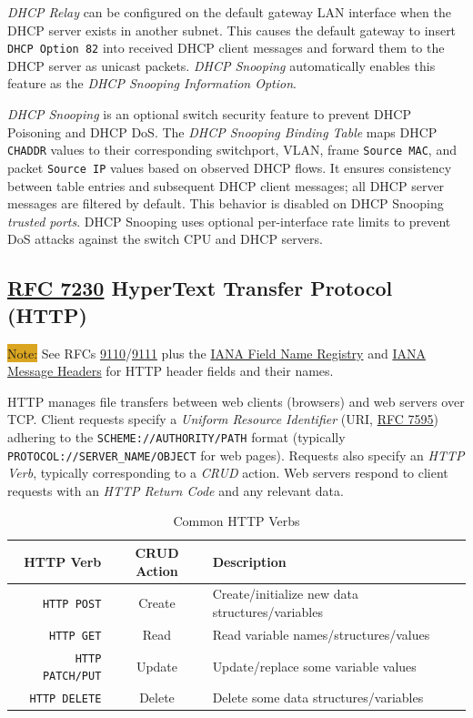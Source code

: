 \documentclass[12pt]{article}
\newcommand{\note}[1]{\colorbox{#1}{Note:}}
\newcommand{\rfc}[1]{\href{https://datatracker.ietf.org/doc/html/rfc#1}{#1}}
\newcommand{\RFC}[1]{\href{https://datatracker.ietf.org/doc/html/rfc#1}{RFC #1}}
\begin{document}
	\textit{DHCP Relay} can be configured on the default gateway LAN interface when the DHCP server exists in another subnet. This causes the default gateway to insert \texttt{DHCP Option 82} into received DHCP client messages and forward them to the DHCP server as unicast packets. \textit{DHCP Snooping} automatically enables this feature as the \textit{DHCP Snooping Information Option}.

	\textit{DHCP Snooping} is an optional switch security feature to prevent DHCP Poisoning and DHCP DoS. The \textit{DHCP Snooping Binding Table} maps DHCP \texttt{CHADDR} values to their corresponding switchport, VLAN, frame \texttt{Source MAC}, and packet \texttt{Source IP} values based on observed DHCP flows. It ensures consistency between table entries and subsequent DHCP client messages; all DHCP server messages are filtered by default. This behavior is disabled on DHCP Snooping \textit{trusted ports}. DHCP Snooping uses optional per-interface rate limits to prevent DoS attacks against the switch CPU and DHCP servers.


	\subsection[RFC 7230 HTTP]{\RFC{7230} HyperText Transfer Protocol (HTTP) \label{subsec:HTTP}}
	\note{Goldenrod} See RFCs \rfc{9110}/\rfc{9111} plus the \href{https://www.iana.org/assignments/http-fields/http-fields.xhtml#field-names}{IANA Field Name Registry} and \href{https://www.iana.org/assignments/message-headers/message-headers.xml#perm-headers}{IANA Message Headers} for HTTP header fields and their names.

	HTTP manages file transfers between web clients (browsers) and web servers over TCP. Client requests specify a \textit{Uniform Resource Identifier} (URI, \RFC{7595}) adhering to the \texttt{SCHEME://AUTHORITY/PATH} format (typically \texttt{PROTOCOL://SERVER\_NAME/OBJECT} for web pages). Requests also specify an \textit{HTTP Verb}, typically corresponding to a \textit{CRUD} action. Web servers respond to client requests with an \textit{HTTP Return Code} and any relevant data.

	\begin{table}[H]
	\centering
	\caption{Common HTTP Verbs \label{tab:HTTP VERBS}}
	\begin{tabular}{r | c | l}
	\hline
	\textbf{HTTP Verb}		& \textbf{CRUD Action}	& \textbf{Description}\\\hline
	\texttt{HTTP POST}		& Create			& Create/initialize new data structures/variables\\\hline
	\texttt{HTTP GET}			& Read			& Read variable names/structures/values\\\hline
	\texttt{HTTP PATCH/PUT}	& Update			& Update/replace some variable values\\\hline
	\texttt{HTTP DELETE}		& Delete			& Delete some data structures/variables\\\hline
	\end{tabular}\end{table}
\end{document}
